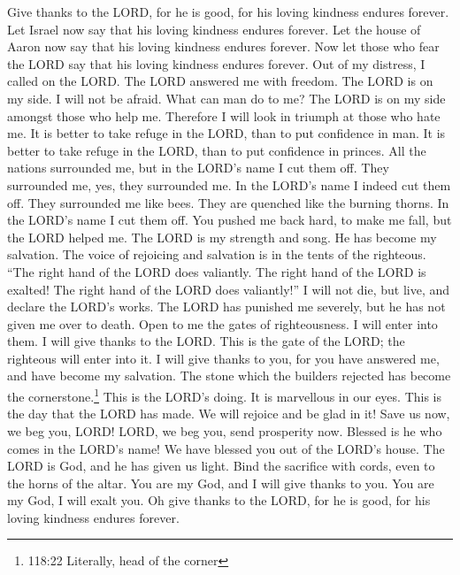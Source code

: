  Give thanks to the LORD, for he is good, for his loving
kindness endures forever.  Let Israel now say that his
loving kindness endures forever.  Let the house of Aaron now
say that his loving kindness endures forever.  Now let those
who fear the LORD say that his loving kindness endures forever.
 Out of my distress, I called on the LORD. The LORD answered
me with freedom.  The LORD is on my side. I will not be
afraid. What can man do to me?  The LORD is on my side
amongst those who help me. Therefore I will look in triumph at those who
hate me.  It is better to take refuge in the LORD, than to
put confidence in man.  It is better to take refuge in the
LORD, than to put confidence in princes.  All the nations
surrounded me, but in the LORD's name I cut them off.  They
surrounded me, yes, they surrounded me. In the LORD's name I indeed cut
them off.  They surrounded me like bees. They are quenched
like the burning thorns. In the LORD's name I cut them off.
 You pushed me back hard, to make me fall, but the LORD
helped me.  The LORD is my strength and song. He has become
my salvation.  The voice of rejoicing and salvation is in
the tents of the righteous. ``The right hand of the LORD does valiantly.
 The right hand of the LORD is exalted! The right hand of
the LORD does valiantly!''  I will not die, but live, and
declare the LORD's works.  The LORD has punished me
severely, but he has not given me over to death.  Open to
me the gates of righteousness. I will enter into them. I will give
thanks to the LORD.  This is the gate of the LORD; the
righteous will enter into it.  I will give thanks to you,
for you have answered me, and have become my salvation. 
The stone which the builders rejected has become the
cornerstone.\footnote{118:22 Literally, head of the corner}
 This is the LORD's doing. It is marvellous in our eyes.
 This is the day that the LORD has made. We will rejoice
and be glad in it!  Save us now, we beg you, LORD! LORD, we
beg you, send prosperity now.  Blessed is he who comes in
the LORD's name! We have blessed you out of the LORD's house.
 The LORD is God, and he has given us light. Bind the
sacrifice with cords, even to the horns of the altar.  You
are my God, and I will give thanks to you. You are my God, I will exalt
you.  Oh give thanks to the LORD, for he is good, for his
loving kindness endures forever.

